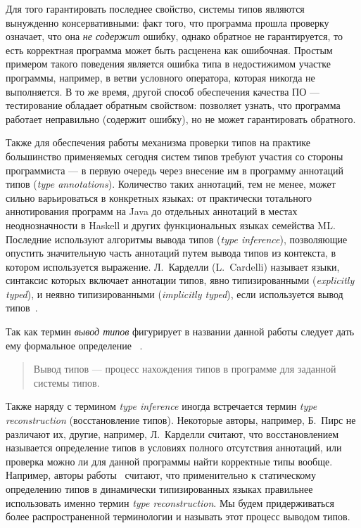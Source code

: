 Для того гарантировать последнее свойство, системы типов являются 
вынужденно консервативными: факт того, что программа прошла проверку означает, что
она \emph{не содержит} ошибку, однако обратное не гарантируется, то есть
корректная программа может быть расценена как ошибочная. Простым примером
такого поведения является ошибка типа в недостижимом участке программы,
например, в ветви условного оператора, которая никогда не выполняется. 
В то же время, другой способ обеспечения качества ПО --- тестирование обладает
обратным свойством: позволяет узнать, что программа работает неправильно
(содержит ошибку), но не может гарантировать обратного.

Также для обеспечения работы механизма проверки типов на практике большинство
применяемых сегодня систем типов требуют участия со стороны программиста --- в
первую очередь через внесение им в программу аннотаций типов (\emph{type
  annotations}). Количество таких аннотаций, тем не менее, может сильно
варьироваться в конкретных языках: от практически тотального аннотирования
программ на Java до отдельных аннотаций в местах неоднозначности в Haskell и
других функциональных языках семейства ML. Последние используют алгоритмы вывода
типов (\emph{type inference}), позволяющие опустить значительную часть аннотаций
путем вывода типов из контекста, в котором используется выражение.  
Л.~Карделли (L.~Cardelli) называет языки, синтаксис которых включает аннотации
типов, явно типизированными (\emph{explicitly typed}), и неявно типизированными
(\emph{implicitly typed}), если используется вывод типов~\cite{Cardelli2004}.

Так как термин \emph{вывод типов} фигурирует в названии данной работы следует
дать ему формальное определение~\cite{Cardelli2004} .

\begin{quote}
  
  Вывод типов --- процесс нахождения типов в программе для заданной системы
  типов. 
\end{quote}


Также наряду с термином \emph{type inference} иногда встречается термин
\emph{type reconstruction} (восстановление типов). Некоторые авторы, например,
Б.~Пирс не различают их, другие, например, Л.~Карделли считают, что
восстановлением называется определение типов в условиях полного отсутствия
аннотаций, или проверка можно ли для данной программы найти корректные типы
вообще. 
Например, авторы работы~\cite{Pluquet2009} считают, что применительно
к статическому определению типов в динамически типизированных языках
правильнее использовать именно термин \emph{type reconstruction}. Мы будем
придерживаться более распространенной терминологии и называть этот процесс
выводом типов.

